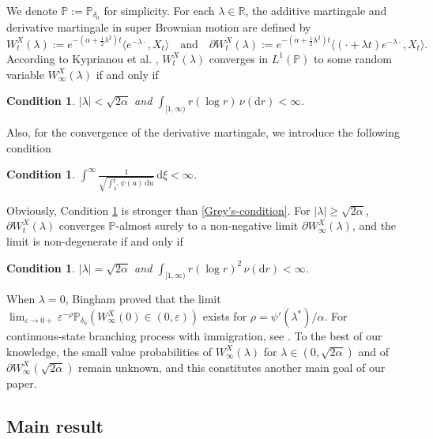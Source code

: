 \documentclass[11pt]{article}
\newtheorem{con1}[con0]{Condition}
\numberwithin{equation}{section}
\def\bgcondition{\begin{con1}}\def\edcondition{\end{con1}}
\begin{document}
We denote $\mathbb{P}:=\mathbb{P}_{\delta_0}$ for simplicity. For each $\lambda\in \mathbb{R}$, the additive martingale and derivative martingale in super Brownian motion are defined by
\[
W_t^X(\lambda) := e^{-(\alpha + \frac{1}{2}\lambda^2)t} \langle e^{-\lambda \cdot}, X_t \rangle
\quad \text{and} \quad
\partial W_t^X(\lambda) := e^{-(\alpha + \frac{1}{2}\lambda^2)t} \langle (\cdot + \lambda t) e^{-\lambda \cdot}, X_t \rangle.
\]
According to Kyprianou et al. \cite{KLMR12},  $W_t^X(\lambda)$ converges in $L^1(\mathbb{P})$ to some random variable $W_\infty^X(\lambda)$ if and only if
\bgcondition\label{cond3}
$|\lambda| < \sqrt{2\alpha}$ and $\displaystyle \int_{[1,\infty)} r (\log r) \, \nu(\mathrm{d}r) < \infty$.
\edcondition

\noindent
Also, for the convergence of the derivative martingale, we introduce the following condition
\bgcondition\label{cond2.5}
$\displaystyle \int^\infty \frac{1}{\sqrt{\int_{\lambda^*}^\xi \psi(u) \, \mathrm{d}u}} \, \mathrm{d}\xi < \infty$.
\edcondition

\noindent
Obviously, Condition \ref{cond2.5} is stronger than \eqref{Grey's-condition}.
For $|\lambda| \geq \sqrt{2\alpha}$, $\partial W_t^X(\lambda)$ converges $\mathbb{P}$-almost surely to a non-negative limit $\partial W_\infty^X(\lambda)$, and the limit is non-degenerate if and only if
\bgcondition\label{cond4}
$|\lambda| = \sqrt{2\alpha}$ and $\displaystyle \int_{[1,\infty)} r (\log r)^2 \, \nu(\mathrm{d}r) < \infty$.
\edcondition

\noindent
When $\lambda = 0$, Bingham \cite{Bingham} proved that the limit $\lim_{\varepsilon \to 0+} \varepsilon^{-\rho} \mathbb{P}_{\delta_0}(W_\infty^X(0) \in (0, \varepsilon))$ exists for $\rho = \psi'(\lambda^*)/\alpha$. For continuous-state branching process with immigration, see \cite{CLR2012}. 
To the best of our knowledge, the small value probabilities of $W_\infty^X(\lambda)$ for $\lambda \in (0, \sqrt{2\alpha})$ and of $\partial W_\infty^X(\sqrt{2\alpha})$ remain unknown, and this constitutes another main goal of our paper.



\subsection{Main result}
\end{document}
